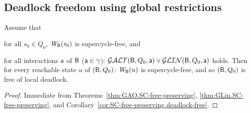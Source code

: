 


\subsection{Deadlock freedom using global restrictions}


\begin{corollary}  
\label{theorem:global.deadlock-free}
Assume that
\bn
\item \label{theorem:global.deadlock-free.initial}
      for all $s_0 \in Q_0$, $\mathit{W}_{\mathsf{B}}({s_0})$ is supercycle-free, and
\item \label{theorem:global.deadlock-free.scfPres}
      for all interactions $\mathsf{a}$ of $\mathsf{B}$ (\ie $\mathsf{a} \in \gamma$):  $\mathcal{GALT}(\mathsf{B}, Q_0, \mathsf{a}) \lor \mathcal{GLIN}(\mathsf{B}, Q_0, \mathsf{a})$ holds.
\en
Then for every reachable state $u$ of $(\mathsf{B}, Q_0)$:  $\mathit{W}_{\mathsf{B}}({u})$ is supercycle-free, and so 
$(\mathsf{B}, Q_0)$ is free of local deadlock.
\end{corollary}
%
\begin{proof}
Immediate from Theorems~\ref{thm:GAO.SC-free-preserving}, \ref{thm:GLin.SC-free-preserving}, and Corollary~\ref{cor:SC-free-preserving.deadlock-free}.
\end{proof}








